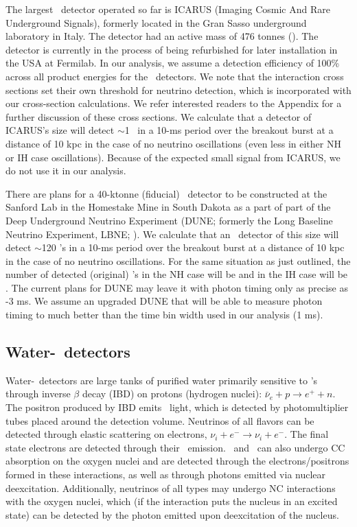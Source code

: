 The largest \ detector operated so far is ICARUS (Imaging 
Cosmic And Rare Underground Signals), formerly located in the Gran Sasso 
underground laboratory in Italy.  The detector had an active mass of
476 tonnes (\citealt{rubbiaetal2011}).  The detector is currently in
the process of being refurbished for later installation in the USA 
at Fermilab.  
In our analysis, we assume a detection efficiency
of 100\% across all product energies for the \ detectors. 
We note that the interaction cross sections set their own
threshold for neutrino detection, which is incorporated with our
cross-section 
calculations.  We refer interested readers to the Appendix for
a further discussion of these cross sections.  
We calculate that a detector of ICARUS's size 
will detect $\sim$1 \nue\ in a 10-ms period over the
breakout burst at a distance of 10 kpc in the case of no neutrino
oscillations (even less in either NH or IH case oscillations). 
Because of the expected small
signal from ICARUS, we do not use it in our analysis.

There are plans for a 40-ktonne (fiducial) \ detector to be
constructed at the Sanford Lab in the
Homestake Mine in South Dakota as a part of
part of the Deep Underground Neutrino Experiment    
 (DUNE; formerly the 
Long Baseline Neutrino Experiment, LBNE; 
\citealt{deoliviera2015}).  We calculate that an \ detector of
this size will detect $\sim$120 \nue's in a 10-ms period over the
breakout burst at a distance of 10 kpc in the case of no neutrino
oscillations.  For the same situation as just outlined, the number of
detected (original) \nue's in the NH case will be  and in the IH
case will be .  The current plans for DUNE
may leave it with photon timing only as precise as -3 ms.  We
assume an upgraded DUNE that will be able to measure photon timing to
much better than the time bin width used in our analysis (1 ms).



\subsection{Water-\cer\ detectors}
Water-\cer\ detectors are large tanks of purified water
primarily sensitive to \anue's through inverse $\beta$ decay (IBD) on
protons (hydrogen nuclei): $\bar\nu_e + p \rightarrow e^+ + n$. 
The positron produced by IBD emits \cer\ light, which is detected by
photomultiplier tubes placed around the detection
volume. Neutrinos of all flavors can be detected through elastic
scattering on electrons, $\nu_i + e^- \rightarrow \nu_i + e^-$.  
The final state electrons are detected through their
\cer\ emission.  \nue\ and \anue\ can also undergo CC absorption 
on the oxygen
nuclei  and are detected through the electrons/positrons formed in
these interactions, as well as through photons emitted via nuclear
deexcitation.  
Additionally, neutrinos of all types may undergo NC
interactions with the oxygen nuclei, which (if the interaction puts
the nucleus in an excited state) can be detected by the photon emitted
upon deexcitation of the nucleus.

